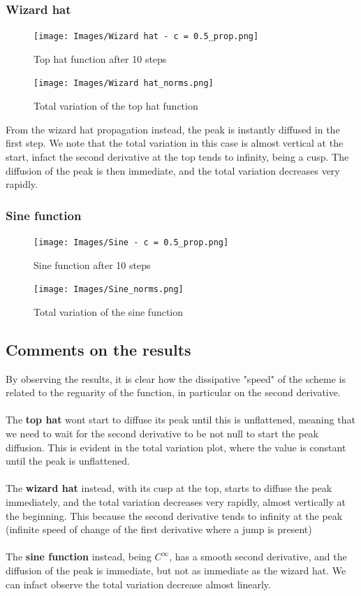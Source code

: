 \documentclass{report}
\begin{document}
\subsubsection*{Wizard hat}
\begin{figure}[H]
    \centering
    \texttt{[image: Images/Wizard hat - c = 0.5\_prop.png]}
    \caption{Top hat function after 10 steps}
    \label{fig:wiz_hat_res}
\end{figure}

\begin{figure}[H]
    \centering
    \texttt{[image: Images/Wizard hat\_norms.png]}
    \caption{Total variation of the top hat function}
    \label{fig:wiz_hat_TV}
\end{figure}
From the wizard hat propagation instead, the peak is instantly diffused in the first step. We note that
the total variation in this case is almost vertical at the start, infact the second derivative at the top
tends to infinity, being a cusp. The diffusion of the peak is then immediate, and the total variation decreases very rapidly.
\subsubsection*{Sine function}
\begin{figure}[H]
    \centering
    \texttt{[image: Images/Sine - c = 0.5\_prop.png]}
    \caption{Sine function after 10 steps}
    \label{fig:sine_res}
\end{figure}
\begin{figure}[H]
    \centering
    \texttt{[image: Images/Sine\_norms.png]}
    \caption{Total variation of the sine function}
    \label{fig:sine_TV}
\end{figure}
\subsection*{Comments on the results}
By observing the results, it is clear how the dissipative "speed" of the scheme is related to the reguarity of the function,
in particular on the second derivative.\\\\
The \textbf{top hat} wont start to diffuse its peak until this is unflattened, meaning that we need to wait for the second derivative to be not null to
start the peak diffusion. This is evident in the total variation plot, where the value is constant until the peak is unflattened.\\\\
The \textbf{wizard hat} instead, with its cusp at the top, starts to diffuse the peak immediately, and the total variation decreases very rapidly, almost vertically at the beginning.
This because the second derivative tends to infinity at the peak (infinite speed of change of the first derivative where a jump is present)\\\\
The \textbf{sine function} instead, being $C^{\infty}$, has a smooth second derivative, and the diffusion of the peak is immediate, but not as immediate as the wizard hat. We can infact observe the total variation
decrease almost linearly.
\end{document}

